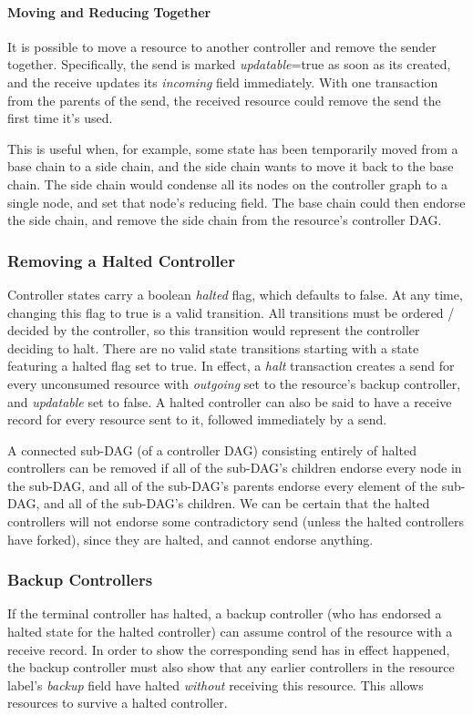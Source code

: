 \documentclass[a4paper,USenglish,cleveref, autoref, thm-restate, anonymous]{lipics-v2021}
\begin{document}
\paragraph{Moving and Reducing Together}
It is possible to move a resource to another controller and remove the sender together. 
Specifically, the send is marked \emph{updatable}=true as soon as its created, and the receive updates its \emph{incoming} field immediately. 
With one transaction from the parents of the send, the received resource could remove the send the first time it's used. 

This is useful when, for example, some state has been temporarily moved from a base chain to a side chain, and the side chain wants to move it back to the base chain.
The side chain would condense all its nodes on the controller graph to a single node, and set that node's reducing field. 
The base chain could then endorse the side chain, and remove the side chain from the resource's controller DAG. 


\subsubsection{Removing a Halted Controller}
Controller states carry a boolean \textit{halted} flag, which defaults to false. 
At any time, changing this flag to true is a valid transition.
All transitions must be ordered / decided by the controller, so this transition would represent the controller deciding to halt. 
There are no valid state transitions starting with a state featuring a halted flag set to true. 
In effect, a \emph{halt} transaction creates a send for every unconsumed resource with \emph{outgoing} set to the resource's backup controller, and \emph{updatable} set to false.
A halted controller can also be said to have a receive record for every resource sent to it, followed immediately by a send. 

A connected sub-DAG (of a controller DAG) consisting entirely of halted controllers can be removed if all of the sub-DAG's children endorse every node in the sub-DAG, and all of the sub-DAG's parents endorse every element of the sub-DAG, and all of the sub-DAG's children. 
We can be certain that the halted controllers will not endorse some contradictory send (unless the halted controllers have forked), since they are halted, and cannot endorse anything. 

\subsubsection{Backup Controllers}
If the terminal controller has halted, a backup controller (who has endorsed a halted state for the halted controller) can assume control of the resource with a receive record. 
In order to show the corresponding send has in effect happened, the backup controller must also show that any earlier controllers in the resource label's \textit{backup} field have halted \textit{without} receiving this resource. 
This allows resources to survive a halted controller. 
\end{document}
